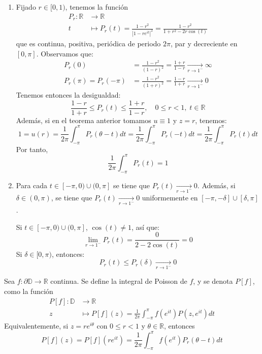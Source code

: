 \begin{properties}
\begin{enumerate}
        \item Fijado $r \in [0, 1)$, tenemos la función
              \begin{align*}
                  P_r: \mathbb{R} & \to \mathbb{R}                                                               \\
                  t               & \mapsto P_r(t) = \frac{1-r^2}{|1-re^{it}|^2} = \frac{1-r^2}{1+r^2-2r\cos(t)}
              \end{align*}
              que es continua, positiva, periódica de periodo $2\pi$, par y decreciente en $[0, \pi]$.
              Observamos que:
              \begin{align*}
                  P_r(0)               & = \frac{1-r^2}{(1-r)^2} = \frac{1+r}{1-r} \xrightarrow[r \to 1^-]{} \infty \\
                  P_r(\pi) = P_r(-\pi) & = \frac{1-r^2}{(1+r)^2} = \frac{1-r}{1+r} \xrightarrow[r \to 1^-]{} 0
              \end{align*}
              Tenemos entonces la desigualdad:
              $$\frac{1-r}{1+r} \leq P_r(t) \leq \frac{1+r}{1-r}, \quad 0 \leq r < 1, \; t \in \mathbb{R}$$
              Además, si en el teorema anterior tomamos $u \equiv 1$ y $z = r$, tenemos:
              $$1 = u(r) = \frac{1}{2\pi} \int_{-\pi}^\pi P_r(\theta - t)dt = \frac{1}{2\pi} \int_{-\pi}^\pi P_r(-t)dt = \frac{1}{2\pi} \int_{-\pi}^\pi P_r(t)dt$$
              Por tanto,
              $$\frac{1}{2\pi} \int_{-\pi}^\pi P_r(t) = 1$$

        \item Para cada $t \in [-\pi, 0) \cup (0, \pi]$ se tiene que $P_r(t) \xrightarrow[r \to 1^-]{} 0$.
              Además, si $\delta \in (0, \pi)$, se tiene que $P_r(t) \xrightarrow[r \to 1^-]{} 0$ uniformemente en $[-\pi, -\delta] \cup [\delta, \pi]$.

              Si $t \in [-\pi, 0) \cup (0, \pi]$, $\cos(t) \neq 1$, así que:
              $$\lim_{r \to 1^-} P_r(t) = \frac{0}{2-2\cos(t)} = 0$$
              Si $\delta \in [0, \pi)$, entonces:
              $$P_r(t) \leq P_r(\delta) \xrightarrow[r \to 1^-]{} 0$$
    \end{enumerate}
\end{properties}

\begin{definition}
    Sea $f: \partial\mathbb{D} \to \mathbb{R}$ continua.
    Se define la integral de Poisson de $f$, y se denota $P[f]$, como la función
    \begin{align*}
        P[f]: \mathbb{D} & \to \mathbb{R}                                                           \\
        z                & \mapsto P[f](z) = \frac{1}{2\pi} \int_{-\pi}^\pi f(e^{it})P(z, e^{it})dt
    \end{align*}
    Equivalentemente, si $z = re^{i\theta}$ con $0 \leq r < 1$ y $\theta \in \mathbb{R}$, entonces
    $$P[f](z) = P[f](re^{it}) = \frac{1}{2\pi} \int_{-\pi}^\pi f(e^{it})P_r(\theta - t)dt$$
\end{definition}

